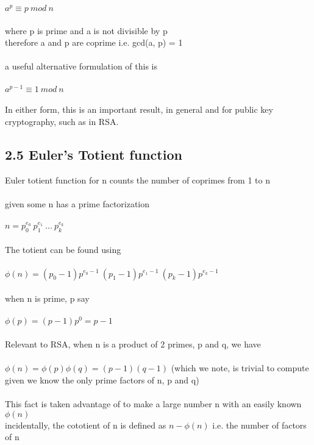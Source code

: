 \documentclass[11pt]{article}   	%
\begin{document}
\boldmath $ a^p \equiv p \ mod \ n $ \unboldmath \\
\\
where p is prime and a is not divisible by p \\
therefore a and p are coprime i.e. gcd(a, p) = 1 \\
\\
a useful alternative formulation of this is \\
\\
$ a^{p-1} \equiv 1 \ mod \ n $ \\
\\
In either form, this is an important result, in general and for public key cryptography, such as in RSA.


\subsection*{2.5 Euler's Totient function}

Euler totient function for n counts the number of coprimes from 1 to n \\
\\
given some n has a prime factorization \\
\\
$ n = p_0^{e_0} \ p_1^{e_1} \ ... \ p_k^{e_k} $ \\
\\
The totient can be found using \\
\\
$ \phi(n) = (p_0 - 1)p^{e_0 - 1} \ (p_1 - 1)p^{e_1 - 1} \ (p_k - 1)p^{e_k - 1} $ \\
\\
when n is prime, p say \\
\\
$ \phi(p) = (p-1)p^0 = p - 1 $ \\
\\
Relevant to RSA, when n is a product of 2 primes, p and q, we have \\
\\
$ \phi(n) = \phi(p)\phi(q) = (p-1)(q-1) $ (which we note, is trivial to compute given we know the only prime factors of n, p and q) \\
\\
This fact is taken advantage of to make a large number n with an easily known $ \phi(n) $
\\
incidentally, the cototient of n is defined as $ n - \phi(n) $ i.e. the number of factors of n \\
\end{document}
